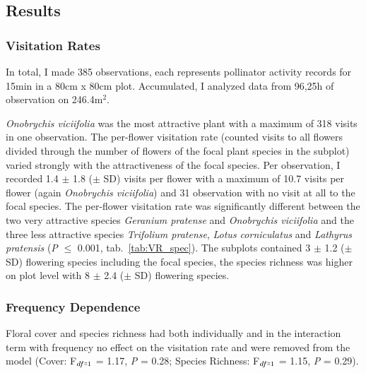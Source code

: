 \label{ch:results_jena}

\subsection{Results}

\subsubsection*{Visitation Rates}			

In total, I made 385 observations, each represents pollinator activity records for 15min in a 80cm x 80cm plot. Accumulated, I analyzed data from 96,25h of observation on 246.4m$^{2}$.

\textit{Onobrychis viciifolia} was the most attractive plant with a maximum of 318 visits in one observation. The per-flower visitation rate (counted visits to all flowers divided through the number of flowers of the focal plant species in the subplot) varied strongly with the attractiveness of the focal species. Per observation, I recorded 1.4 $\pm$ 1.8 ($\pm$ SD) visits per flower with a maximum of 10.7 visits per flower (again \textit{Onobrychis viciifolia}) and 31 observation with no visit at all to the focal species. The per-flower visitation rate was significantly different between the two very attractive species \textit{Geranium pratense} and \textit{Onobrychis viciifolia} and the three less attractive species  \textit{Trifolium pratense}, \textit{Lotus corniculatus} and \textit{Lathyrus pratensis} (\textit{P} $\leq$ 0.001, tab.~\ref{tab:VR_spec}). The subplots contained 3 $\pm$ 1.2 ($\pm$ SD) flowering species including the focal species, the species richness was higher on plot level with 8 $\pm$ 2.4 ($\pm$ SD) flowering species.

\subsubsection*{Frequency Dependence}			
Floral cover and species richness had both individually and in the interaction term with frequency no effect on the visitation rate and were removed from the model (Cover: F$_{df\shorteq1}$ = 1.17, \textit{P} = 0.28; Species Richness: F$ _{df\shorteq1} $ = 1.15, \textit{P} = 0.29). 

